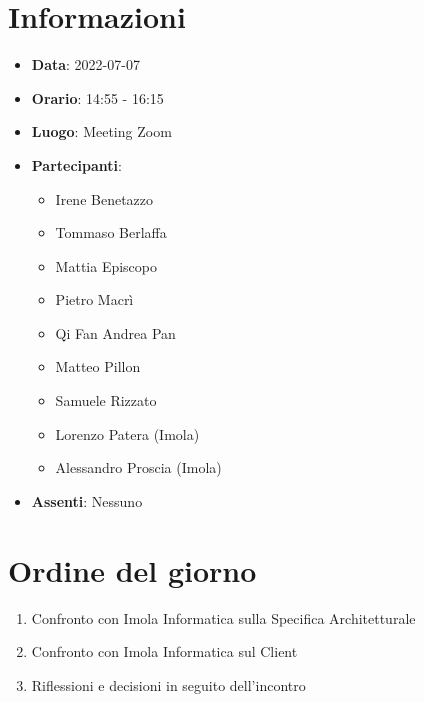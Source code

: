 \section{Informazioni}
	\begin{itemize}
		\item \textbf{Data}: 2022-07-07     %
		\item \textbf{Orario}: 14:55 - 16:15     %
		\item \textbf{Luogo}: Meeting Zoom
		\item \textbf{Partecipanti}:
		\begin{itemize}
			\item Irene Benetazzo
			\item Tommaso Berlaffa
			\item Mattia Episcopo
			\item Pietro Macrì
			\item Qi Fan Andrea Pan
			\item Matteo Pillon
			\item Samuele Rizzato
			\item Lorenzo Patera (Imola)
			\item Alessandro Proscia (Imola)
		\end{itemize}
        \item \textbf{Assenti}: Nessuno
	\end{itemize}
    
	\section{Ordine del giorno}
	\begin{enumerate}
		\item Confronto con Imola Informatica sulla Specifica Architetturale
		\item Confronto con Imola Informatica sul Client
    	\item Riflessioni e decisioni in seguito dell'incontro
		
	\end{enumerate}
	\newpage